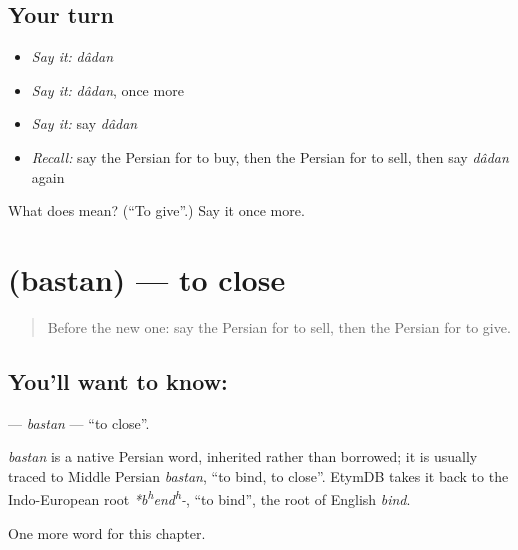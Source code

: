 \subsection*{Your turn}
\begin{itemize}
\raggedright
  \item \emph{Say it:} \emph{dâdan}
  \item \emph{Say it:} \emph{dâdan}, once more
  \item \emph{Say it:} say \emph{dâdan}
  \item \emph{Recall:} say the Persian for to buy, then the Persian for to sell, then say \emph{dâdan} again
\end{itemize}

\begin{tcolorbox}[breakable,colback=teal!4,colframe=teal!35!black,title={Before you move on}]
What does  mean? (\textquotedblleft{}To give\textquotedblright{}.) Say it once more.
\end{tcolorbox}
\section[\texorpdfstring{\fa{بستن} (bastan)}{بستن (bastan)}]{ (bastan) — to close}

\label{lesson:FA-C37-bastan}



\begin{quote}
Before the new one: say the Persian for to sell, then the Persian for to give.
\end{quote}

\subsection*{You'll want to know: }
\textbf{} — \emph{bastan} — \textquotedblleft{}to close\textquotedblright{}.

\begin{cousinweb}
\emph{bastan} is a native Persian word, inherited rather than borrowed; it is usually traced to Middle Persian \emph{bastan}, \textquotedblleft{}to bind, to close\textquotedblright{}. EtymDB takes it back to the Indo-European root \emph{*b\textsuperscript{h}end\textsuperscript{h}-}, \textquotedblleft{}to bind\textquotedblright{}, the root of English \emph{bind}.
\end{cousinweb}

\begin{grammarlens}[title={What you've built}]
One more word for this chapter.
\end{grammarlens}

